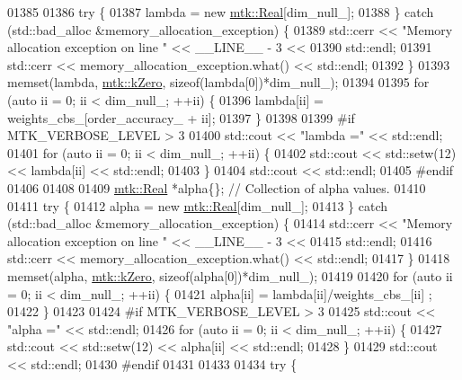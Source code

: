 \begin{DoxyCode}
{{01385 
01386   \textcolor{keywordflow}{try} \{
01387     lambda = \textcolor{keyword}{new} \hyperlink{group__c01-roots_gac080bbbf5cbb5502c9f00405f894857d}{mtk::Real}[dim\_null\_];
01388   \} \textcolor{keywordflow}{catch} (std::bad\_alloc &memory\_allocation\_exception) \{
01389     std::cerr << \textcolor{stringliteral}{"Memory allocation exception on line "} << \_\_LINE\_\_ - 3 <<
01390       std::endl;
01391     std::cerr << memory\_allocation\_exception.what() << std::endl;
01392   \}
01393   memset(lambda, \hyperlink{group__c01-roots_ga59a451a5fae30d59649bcda274fea271}{mtk::kZero}, \textcolor{keyword}{sizeof}(lambda[0])*dim\_null\_);
01394 
01395   \textcolor{keywordflow}{for} (\textcolor{keyword}{auto} ii = 0; ii < dim\_null\_; ++ii) \{
01396     lambda[ii] = weights\_cbs\_[order\_accuracy\_ + ii];
01397   \}
01398 
01399 \textcolor{preprocessor}{  #if MTK\_VERBOSE\_LEVEL > 3}
01400   std::cout << \textcolor{stringliteral}{"lambda ="} << std::endl;
01401   \textcolor{keywordflow}{for} (\textcolor{keyword}{auto} ii = 0; ii < dim\_null\_; ++ii) \{
01402     std::cout << std::setw(12) << lambda[ii] << std::endl;
01403   \}
01404   std::cout << std::endl;
01405 \textcolor{preprocessor}{  #endif}
01406 
01408 
01409   \hyperlink{group__c01-roots_gac080bbbf5cbb5502c9f00405f894857d}{mtk::Real} *alpha\{\}; \textcolor{comment}{// Collection of alpha values.}
01410 
01411   \textcolor{keywordflow}{try} \{
01412     alpha = \textcolor{keyword}{new} \hyperlink{group__c01-roots_gac080bbbf5cbb5502c9f00405f894857d}{mtk::Real}[dim\_null\_];
01413   \} \textcolor{keywordflow}{catch} (std::bad\_alloc &memory\_allocation\_exception) \{
01414     std::cerr << \textcolor{stringliteral}{"Memory allocation exception on line "} << \_\_LINE\_\_ - 3 <<
01415       std::endl;
01416     std::cerr << memory\_allocation\_exception.what() << std::endl;
01417   \}
01418   memset(alpha, \hyperlink{group__c01-roots_ga59a451a5fae30d59649bcda274fea271}{mtk::kZero}, \textcolor{keyword}{sizeof}(alpha[0])*dim\_null\_);
01419 
01420   \textcolor{keywordflow}{for} (\textcolor{keyword}{auto} ii = 0; ii < dim\_null\_; ++ii) \{
01421     alpha[ii] = lambda[ii]/weights\_cbs\_[ii] ;
01422   \}
01423 
01424 \textcolor{preprocessor}{  #if MTK\_VERBOSE\_LEVEL > 3}
01425   std::cout << \textcolor{stringliteral}{"alpha ="} << std::endl;
01426   \textcolor{keywordflow}{for} (\textcolor{keyword}{auto} ii = 0; ii < dim\_null\_; ++ii) \{
01427     std::cout << std::setw(12) << alpha[ii] << std::endl;
01428   \}
01429   std::cout << std::endl;
01430 \textcolor{preprocessor}{  #endif}
01431 
01433 
01434   \textcolor{keywordflow}{try} \{
}}
\end{DoxyCode}
